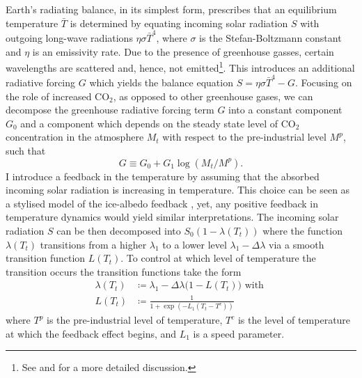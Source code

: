 \documentclass[../../main.tex]{subfiles}
\begin{document}
Earth's radiating balance, in its simplest form, prescribes that an equilibrium temperature $\bar{T}$ is determined by equating incoming solar radiation $S$ with outgoing long-wave radiations $\eta \sigma \bar{T}^4$, where $\sigma$ is the Stefan-Boltzmann constant and $\eta$ is an emissivity rate. Due to the presence of greenhouse gasses, certain wavelengths are scattered and, hence, not emitted\footnote{See \cite{ghil_topics_2012} and \cite{greiner_economic_2005} for a more detailed discussion.}. This introduces an additional radiative forcing $G$ which yields the balance equation $S = \eta \sigma \bar{T}^4 - G$. Focusing on the role of increased CO$_2$, as opposed to other greenhouse gases, we can decompose the greenhouse radiative forcing term $G$ into a constant component $G_0$ and a component which depends on the steady state level of CO$_2$ concentration in the atmosphere $M_t$ with respect to the pre-industrial level $M^p$, such that \begin{equation}
    G \equiv G_0 + G_1 \log(M_t / M^p).
\end{equation} I introduce a feedback in the temperature by assuming that the absorbed incoming solar radiation is increasing in temperature. This choice can be seen as a stylised model of the ice-albedo feedback \citep{mcguffie_climate_2014, ashwin_tipping_2012}, yet, any positive feedback in temperature dynamics would yield similar interpretations. 
The incoming solar radiation $S$ can be then decomposed into $S_0 \left(1 - \lambda(T_t)\right)$ where the function $\lambda(T_t)$ transitions from a higher $\lambda_1$ to a lower level $\lambda_1 - \Delta \lambda$ via a smooth transition function $L(T_t)$. To control at which level of temperature the transition occurs the transition functions take the form \begin{subequations} \label{eq:albedo-specification}
    \begin{align}
        \lambda(T_t) &\coloneqq \lambda_1 - \Delta \lambda \big(1 - L(T_t)\big) \text{ with } \label{eq:lambda} \\
        L(T_t) &\coloneqq \frac{1}{1 + \exp \left(-L_1 \left(T_t - T^c\right)\right)}
    \end{align} 
\end{subequations} where $T^p$ is the pre-industrial level of temperature, $T^c$ is the level of temperature at which the feedback effect begins, and $L_1$ is a speed parameter. 
\end{document}
